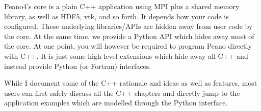 Peano4's core is a plain C++ application using MPI plus a shared memory
library, as well as HDF5, vtk, and so forth.
It depends how your code is configured.
These underlying libraries/APIs are hidden away from user code by the core.
At the same time, we provide a Python API which hides away most of the core.
At one point, you will however be required to program Peano directly with C++. 
It is just some high-level extensions which hide away all C++ and instead
provide Python (or Fortran) interfaces.


While I document some of the C++ rationale and ideas as well as features, most
users can first safely discuss all the C++ chapters and directly jump to the
application examples which are modelled through the Python interface.
 